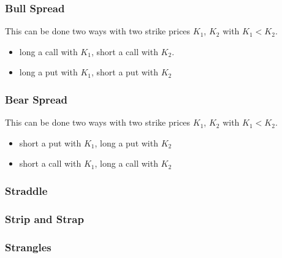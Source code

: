 \documentclass{article}
\begin{document}
\subsubsection{Bull Spread}
This can be done two ways with two strike prices $K_1$, $K_2$ with $K_1 < K_2$.
\begin{itemize}
    \item long a call with $K_1$, short a call with $K_2$.
    \item long a put with $K_1$, short a put with $K_2$
\end{itemize}

\subsubsection{Bear Spread}
This can be done two ways with two strike prices $K_1$, $K_2$ with $K_1 < K_2$.
\begin{itemize}
    \item short a put with $K_1$, long a put with $K_2$
    \item short a call with $K_1$, long a call with $K_2$
\end{itemize}

\subsubsection{Straddle}

\subsubsection{Strip and Strap}

\subsubsection{Strangles}
\end{document}
